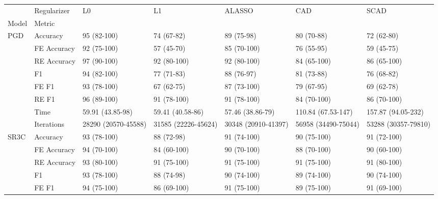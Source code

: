 \begin{tabular}{lllllll}
\toprule
    & Regularizer &                   L0 &                   L1 &               ALASSO &                  CAD &                 SCAD \\
Model & Metric &                      &                      &                      &                      &                      \\
\midrule
PGD & Accuracy &          95 (82-100) &           74 (67-82) &           89 (75-98) &           80 (70-88) &           72 (62-80) \\
    & FE Accuracy &          92 (75-100) &           57 (45-70) &          85 (70-100) &           76 (55-95) &           59 (45-75) \\
    & RE Accuracy &          97 (90-100) &          92 (80-100) &          92 (80-100) &          84 (65-100) &          86 (65-100) \\
    & F1 &          94 (82-100) &           77 (71-83) &           88 (76-97) &           81 (73-88) &           76 (68-82) \\
    & FE F1 &          93 (78-100) &           67 (62-75) &          87 (73-100) &           79 (67-95) &           69 (62-78) \\
    & RE F1 &          96 (89-100) &          91 (78-100) &          91 (78-100) &          84 (70-100) &          86 (70-100) \\
    & Time &     59.91 (43.85-98) &     59.41 (40.58-86) &     57.46 (38.86-79) &   110.84 (67.53-147) &   157.87 (94.05-232) \\
    & Iterations &  28290 (20570-45588) &  31585 (22226-45624) &  30348 (20910-41397) &  56958 (34490-75044) &  53288 (30357-79810) \\
SR3C & Accuracy &          93 (78-100) &           88 (72-98) &          91 (74-100) &          90 (75-100) &          91 (72-100) \\
    & FE Accuracy &          94 (70-100) &          84 (60-100) &          90 (70-100) &          88 (70-100) &          90 (60-100) \\
    & RE Accuracy &          93 (80-100) &          91 (75-100) &          91 (75-100) &          91 (75-100) &          91 (80-100) \\
    & F1 &          93 (78-100) &           88 (74-98) &          90 (74-100) &          89 (74-100) &          90 (74-100) \\
    & FE F1 &          94 (75-100) &          86 (69-100) &          91 (75-100) &          89 (75-100) &          91 (69-100) \\

\end{tabular}
